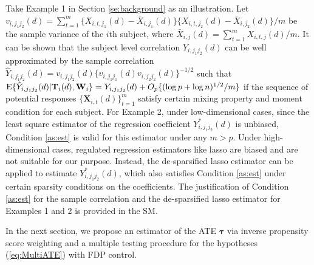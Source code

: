 \documentclass[12pt]{article}
\theoremstyle{definition}
\newcommand{\E}{\rm E}
\newcommand{\bT}{{\mathbf T}}
\newcommand{\bW}{{\mathbf W}}
\newcommand{\bX}{{\mathbf X}}
\newcommand{\bY}{{\mathbf Y}}
\newcommand{\btau}{\boldsymbol{\tau}}
\begin{document}
Take Example 1 in Section \ref{se:background} as an illustration. Let $v_{i, j_1j_2}(d) = \sum_{t = 1}^{m} \{X_{i, t, j_1}(d) - \bar{X}_{i, j_1}(d)\}\{X_{i, t, j_2}(d) - \bar{X}_{i, j_2}(d)\} / m$ be the sample variance of the $i$th subject, where $\bar{X}_{i, j}(d) = \sum_{t = 1}^{m} X_{i, t, j}(d) / m$. 
It can be shown that the subject level correlation $Y_{i, j_1j_2}(d)$ can be 
well approximated by the sample correlation 
$\hat{Y}_{i, j_1j_2}(d) = 
v_{i, j_1j_2}(d) \{v_{i, j_1j_1}(d) v_{i, j_2j_2}(d)\}^{-1/2}$ such that ${\E}\{\hat{Y}_{i, j_1j_2}(d) | \bT_i(d), \bW_i\} = Y_{i, j_1j_2}(d) + O_p\{(\log p + \log n)^{1/2} / m\}$ if the sequence of potential responses $\{\bX_{i, t}(d)\}_{t = 1}^{m}$ satisfy certain mixing property and moment condition for each subject.
For Example 2, under low-dimensional cases, since the least square estimator of the regression coefficient $Y^{\ast}_{i, j_1j_2}(d)$ is unbiased, Condition \ref{as:est} is valid for this estimator under any $m > p$. 
Under high-dimensional cases, regulated regression estimators like lasso \citep{tibshirani1996regression} are biased and are not suitable for our purpose.
Instead, the de-sparsified lasso estimator \citep{vanderGeerRitov2014} can be applied to estimate $Y^{\ast}_{i, j_1j_2}(d)$, which also satisfies Condition \ref{as:est} under certain sparsity conditions on the coefficients. 
The justification of Condition \ref{as:est} for the sample correlation and the de-sparsified lasso estimator for Examples 1 and 2 is provided in the SM.

In the next section, we propose an estimator of the ATE $\btau$ via inverse propensity score weighting and a multiple testing procedure for the hypotheses (\ref{eq:MultiATE}) with FDP control.
\end{document}
